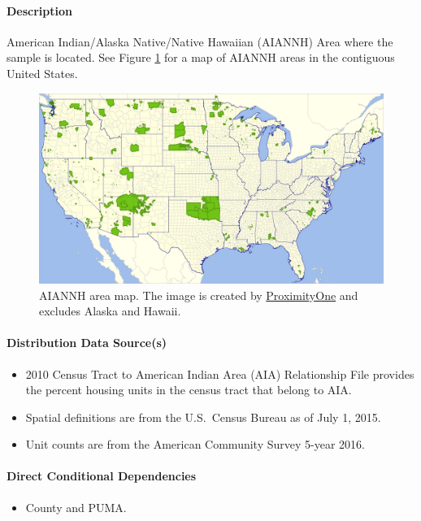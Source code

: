 \paragraph{Description}
American Indian/Alaska Native/Native Hawaiian (AIANNH) Area where the sample is located. See Figure \ref{fig:aiannh_map} for a map of AIANNH areas in the contiguous United States.

\begin{figure}
    \centering
    \includegraphics[width=1\linewidth]{images/aiannh_48b.jpg}
    \caption{AIANNH area map. The image is created by \href{https://proximityone.com/aiannh.htm}{ProximityOne} and excludes Alaska and Hawaii.}
    \label{fig:aiannh_map}
\end{figure}


\paragraph{Distribution Data Source(s)}
\begin{itemize}
    \item 2010 Census Tract to American Indian Area (AIA) Relationship File provides the percent housing units in the census tract that belong to AIA. 
    \item Spatial definitions are from the U.S.~Census Bureau as of July 1, 2015.
    \item Unit counts are from the American Community Survey 5-year 2016.
\end{itemize}

\paragraph{Direct Conditional Dependencies}
\begin{itemize}
    \item County and PUMA.
\end{itemize}

